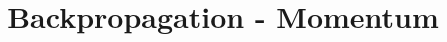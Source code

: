 \documentclass[a4paper,11pt]{article}
\begin{document}
\title{Backpropagation - Momentum}
\end{document}
